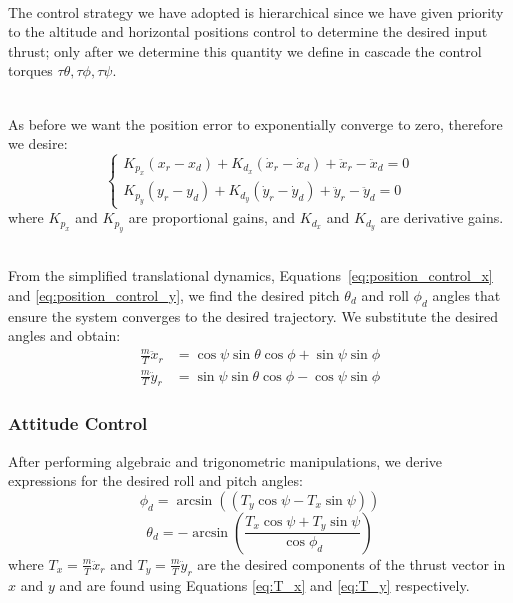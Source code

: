 \documentclass[main]{subfiles}
\begin{document}
\noindent\\
The control strategy we have adopted is hierarchical \cite{model_quadrotor}
since we have given priority to the 
altitude and horizontal positions control to determine the desired input thrust;
only after we determine this quantity
we define in cascade the control torques $\tau\theta, \tau\phi, \tau\psi$.

\noindent\\
As before we want the position error to exponentially converge to zero,
therefore we desire:
\begin{equation}
    \begin{cases}
 K_{p_x} ( x_r - x_d )  + K_{d_x} (\dot{x}_r -\dot{x}_d) + \ddot{x}_r -\ddot{x}_d  = 0 \\[6pt]
 K_{p_y} (y_r - y_d )  + K_{d_y} ( \dot{y}_r - \dot{y}_d) +  \ddot{y}_r - \ddot{y}_d = 0
    \end{cases}
\end{equation}
where $K_{p_x}$ and $K_{p_y}$ are proportional gains, and $K_{d_x}$ and $K_{d_y}$ are derivative gains.

\noindent \\
From the simplified translational dynamics, Equations~\ref{eq:position_control_x}
and \ref{eq:position_control_y}, we find the desired pitch \( \theta_d \) 
and roll \( \phi_d \) angles that ensure the system converges to the desired trajectory.
We substitute the desired angles and obtain:
\begin{subequations}
    \begin{align}
 \frac{m}{T} \ddot{x}_r &= \cos\psi \sin\theta \cos\phi + \sin\psi \sin\phi \label{eq:T_x} \\[6pt]
 \frac{m}{T} \ddot{y}_r &= \sin\psi \sin\theta \cos\phi - \cos\psi \sin\phi \label{eq:T_y}
    \end{align}
\end{subequations}

\subsubsection{Attitude Control}
After performing algebraic and trigonometric manipulations, we derive expressions for the desired roll and pitch angles:
\begin{equation}
    \phi_d =  \arcsin\left(  (T_y \cos\psi - T_x \sin\psi) \right)
    \label{eq:desire_phi}
\end{equation}
\begin{equation}
    \theta_d = - \arcsin\left(\frac{T_x \cos\psi + T_y \sin\psi}{ \cos\phi_d } \right)
    \label{eq:desire_theta}
\end{equation}
where $T_x = \frac{m}{T} \ddot{x}_r$ and $T_y = \frac{m}{T} \ddot{y}_r$ are the
desired components of the thrust vector in $x$ and $y$ and are found
using Equations \ref{eq:T_x} and \ref{eq:T_y} respectively.
\end{document}
